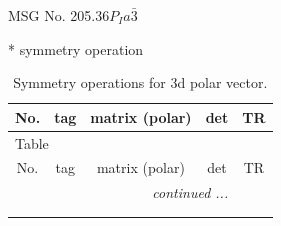 \documentclass[fleqn,8pt]{jsarticle}
\begin{document}
\setcounter{MaxMatrixCols}{32}

\renewcommand{\tablename}{Table~}
\renewcommand{\figurename}{Figure~}
\begin{center}
\LARGE
MSG No. 205.36\quad$P_{I}a\bar{3}$
\end{center}
* symmetry operation
\renewcommand{\arraystretch}{1.3}
\begin{longtable}{ccccc}
\caption{Symmetry operations for 3d polar vector.}
 \\
 \hline \hline
No. & tag & matrix (polar) & det & TR \\ \hline \endfirsthead

\multicolumn{4}{l}{\tablename\ \thetable{}} \\
 \hline \hline
No. & tag & matrix (polar) & det & TR \\ \hline \endhead

 \hline \hline
\multicolumn{4}{r}{\footnotesize\it continued ...} \\ \endfoot

 \hline \hline
\multicolumn{4}{r}{} \\ \endlastfoot


\end{longtable}
\end{document}
